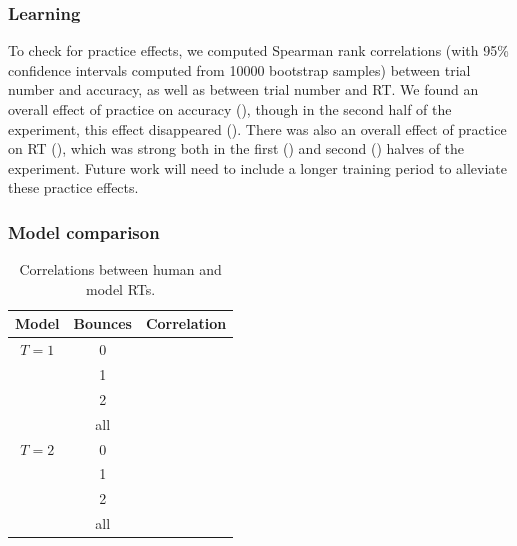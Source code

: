 \documentclass[10pt,letterpaper]{article}
\begin{document}
\subsubsection{Learning}

To check for practice effects, we computed Spearman rank correlations (with 95\% confidence intervals computed from 10000 bootstrap samples) between trial number and accuracy, as well as between trial number and RT.
We found an overall effect of practice on accuracy (\ResponseTrialCorr{}), though in the second half of the experiment, this effect disappeared (\ResponseTrialCorrLate{}).
There was also an overall effect of practice on RT (\RTTrialCorr{}), which was strong both in the first (\RTTrialCorrEarly{}) and second (\RTTrialCorrLate{}) halves of the experiment.
Future work will need to include a longer training period to alleviate these practice effects.

\subsubsection{Model comparison}

\begin{table}
    \centering
    \begin{tabular}{ccl}
    \toprule
    \textbf{Model} & \textbf{Bounces} & \textbf{Correlation} \\
    \midrule
    $T=1$ & 0   & \NoSamplesHoleRTCorrZeroBounces{} \\
          & 1   & \NoSamplesHoleRTCorrOneBounce{} \\
          & 2   & \NoSamplesHoleRTCorrTwoBounces{} \\
          & all & \NoSamplesHoleRTCorr{} \\
    \midrule
    $T=2$ & 0   & \HoleRTCorrZeroBounces{} \\
          & 1   & \HoleRTCorrOneBounce{} \\
          & 2   & \HoleRTCorrTwoBounces{} \\
          & all & \HoleRTCorr{} \\
    \bottomrule
    \end{tabular}
    \caption{Correlations between human and model RTs.}
    \label{tbl:rt}
\end{table}
\end{document}
